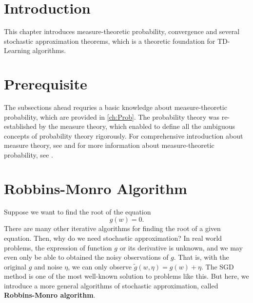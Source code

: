 \section{Introduction}
    This chapter introduces measure-theoretic probability, convergence and several stochastic approximation theorems, which is a theoretic foundation for TD-Learning algorithms.
\section{Prerequisite}
    The subsections ahead requries a basic knowledge about measure-theoretic probability, which are provided in \ref{ch:Prob}.
    The probability theory was re-established by the measure theory, which enabled to define all the ambiguous concepts of probability theory rigorously.
    For comprehensive introduction about measure theory, see \cite{Axler2020} and for more information about measure-theoretic probability, see \cite{Brzezniak2007}.
\section{Robbins-Monro Algorithm}
    Suppose we want to find the root of the equation
    \begin{equation}
        g(w) = 0.
    \end{equation}
    There are many other iterative algorithms for finding the root of a given equation. Then, why do we need
    stochastic approximation? In real world problems, the expression of function $g$ or its derivative is unknown,
    and we may even only be able to obtained the noisy observations of $g$. That is, with the original $g$ and noise $\eta$,
    we can only observe $\tilde{g}(w,\eta) = g(w) + \eta$. The SGD method is one of the most well-known solution to problems like this.
    But here, we introduce a more general algorithms of stochastic approximation, called \textbf{Robbins-Monro algorithm}.

